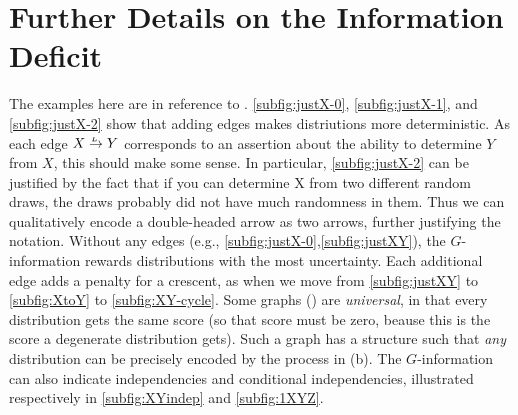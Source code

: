 
\section{Further Details on the Information Deficit}

The examples here are in reference to .
\ref{subfig:justX-0}, \ref{subfig:justX-1}, and \ref{subfig:justX-2} show that adding edges makes distriutions more deterministic. 
As each edge $\ed LXY$ corresponds to an assertion about the ability to determine $Y$ from $X$, this should make some sense.
In particular, \ref{subfig:justX-2} can be justified by the fact that if you can determine X from two different random draws, the draws probably did not have much randomness in them. Thus we can qualitatively encode a double-headed arrow as two arrows, further justifying the notation.
%	
Without any edges (e.g., \ref{subfig:justX-0},\ref{subfig:justXY}), the $G$-information rewards distributions with the most uncertainty. Each additional edge adds a penalty for a crescent, as when we move from \ref{subfig:justXY} to \ref{subfig:XtoY} to \ref{subfig:XY-cycle}.
%
Some graphs () are \emph{universal}, in that every distribution gets the same score (so that score must be zero, beause this is the score a degenerate distribution gets). Such a graph has a structure such that \emph{any} distribution can be precisely encoded by the process in (b). 
%	
The $G$-information can also indicate independencies and conditional independencies, illustrated respectively in \ref{subfig:XYindep} and \ref{subfig:1XYZ}.

